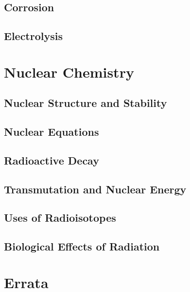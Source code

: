 \documentclass[12pt, openany, letterpaper]{memoir}
\begin{document}
\section{Corrosion}

\section{Electrolysis}

\setcounter{chapter}{20}
\chapter{Nuclear Chemistry}

\section{Nuclear Structure and Stability}

\section{Nuclear Equations}

\section{Radioactive Decay}

\section{Transmutation and Nuclear Energy}

\section{Uses of Radioisotopes}

\section{Biological Effects of Radiation}

\backmatter
\chapter{Errata}
\end{document}
